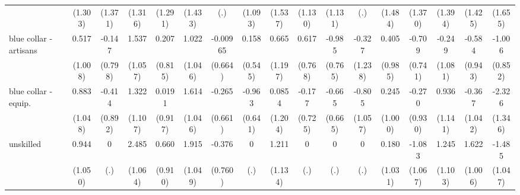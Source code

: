 {\begin{tabular}{l*{16}{c}}
                    &     (1.303)         &     (1.371)         &     (1.316)         &     (1.291)         &     (1.433)         &         (.)         &     (1.093)         &     (1.537)         &     (1.130)         &     (1.131)         &         (.)         &     (1.484)         &     (1.370)         &     (1.394)         &     (1.425)         &     (1.655)         \\
[1em]
blue collar - artisans&       0.517         &      -0.147         &       1.537         &       0.207         &       1.022         &    -0.00965         &       0.158         &       0.665         &       0.617         &      -0.985         &      -0.327         &       0.405         &      -0.709         &      -0.249         &      -0.584         &      -1.006         \\
                    &     (1.008)         &     (0.798)         &     (1.057)         &     (0.815)         &     (1.046)         &     (0.664)         &     (0.545)         &     (1.197)         &     (0.768)         &     (0.765)         &     (1.238)         &     (0.985)         &     (0.741)         &     (1.081)         &     (0.943)         &     (0.852)         \\
[1em]
blue collar - equip.&       0.883         &      -0.414         &       1.322         &      0.0191         &       1.614         &      -0.265         &      -0.963         &      0.0854         &      -0.177         &      -0.665         &      -0.805         &       0.245         &      -0.270         &       0.936         &      -0.367         &      -2.326         \\
                    &     (1.048)         &     (0.892)         &     (1.107)         &     (0.917)         &     (1.046)         &     (0.661)         &     (0.641)         &     (1.204)         &     (0.725)         &     (0.665)         &     (1.057)         &     (1.000)         &     (0.930)         &     (1.141)         &     (1.042)         &     (1.346)         \\
[1em]
unskilled           &       0.944         &           0         &       2.485\sym{*}  &       0.660         &       1.915         &      -0.376         &           0         &       1.211         &           0         &           0         &           0         &       0.180         &      -1.083         &       1.245         &       1.622         &      -1.485         \\
                    &     (1.050)         &         (.)         &     (1.064)         &     (0.910)         &     (1.049)         &     (0.760)         &         (.)         &     (1.134)         &         (.)         &         (.)         &         (.)         &     (1.031)         &     (1.067)         &     (1.103)         &     (1.006)         &     (1.047)         \\

\end{tabular}}
